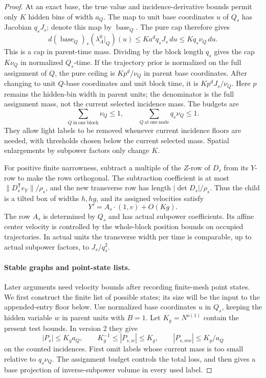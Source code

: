 \begin{proof}
At an exact base, the true value and incidence-derivative bounds
permit only \(K\) hidden bins of width \(a_Q\).  The map to unit
base coordinates \(u\) of \(Q_s\) has Jacobian \(q_sJ_s\);
denote this map by \(\operatorname{base}_Q\).
The pure cap therefore gives
\begin{equation}
 d(\operatorname{base}_Q)_*(\lambda_A^0|_Q)(u)
   \le Ka^dq_sJ_s\,du
   \le Kq_s\nu_Q\,du.
 \label{a03:packet-base-cap}
\end{equation}
This is a cap in parent-time mass.  Dividing by the block length
\(q_s\) gives the cap \(K\nu_Q\) in normalized \(Q_s\)-time.
If the trajectory prior is normalized on the full assignment of \(Q\),
the pure ceiling is \(Kp^d/\nu_Q\) in parent base coordinates.
After changing to unit \(Q\)-base coordinates and unit block time,
it is \(Kp^dJ_s/\nu_Q\).  Here \(p\) remains the hidden-bin width
in parent units; the denominator is the full assignment mass, not the
current selected incidence mass.
The budgets are
\[
 \sum_{Q\ \mathrm{in\ one\ block}}\nu_Q\le1,
 \qquad \sum_{Q\ \mathrm{at\ one\ node}}q_s\nu_Q\le1.
\]
They allow light labels to be removed whenever current incidence
floors are needed, with thresholds chosen below the current selected
mass.  Spatial enlargements by subpower factors only change \(K\).

For positive finite narrowness, subtract a multiple of the \(Z\)-row
of \(D_s\) from its \(Y\)-row to make the rows orthogonal.  The
subtraction coefficient is at most
\(\|D_s^{\mathsf T}e_Y\|/\rho_s\), and the new transverse row has
length \(|\det D_s|/\rho_s\).  Thus the child is a tilted box of
widths \(h,hg\), and its assigned velocities satisfy
\[
 Y'=A_s\cdot(1,v)+O(Kg).
\]
The row \(A_s\) is determined by \(Q_s\) and has actual subpower
coefficients.  Its affine center velocity is controlled by the
whole-block position bounds on occupied trajectories.  In actual
units the transverse width per time is comparable, up to actual
subpower factors, to \(J_s/q_s^2\).

\paragraph{Stable graphs and point-state lists.}

Later arguments need velocity bounds after recording finite-mesh
point states.  We first construct the finite list of possible states;
its size will be the input to the appended-entry floor below.
Use normalized base coordinates \(u\) in \(Q_s\), keeping the hidden
variable \(w\) in parent units with \(B=1\).  Let \(K_g=N^{o(1)}\)
contain the present test bounds.  In version 2 they give
\[
 |P_s|\le K_ga_Q,\qquad
 K_g^{-1}\le |P_{s,w}|\le K_g,\qquad
 |P_{s,ww}|\le K_g/a_Q
\]
on the counted incidences.  First omit labels whose current mass is
too small relative to \(q_s\nu_Q\).  The assignment budget controls
the total loss, and  then gives a base
projection of inverse-subpower volume in every used label.


\end{proof}
